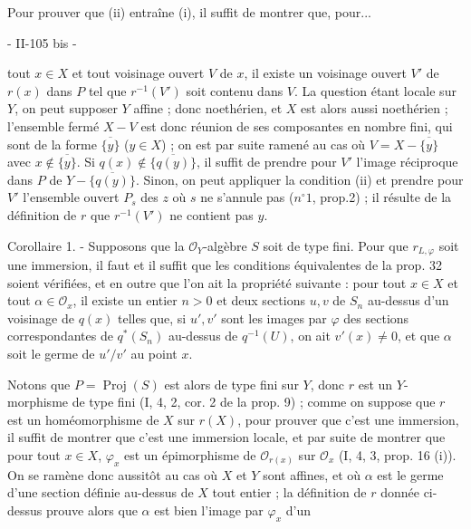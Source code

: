 Pour prouver que (ii) entraîne (i), il suffit de montrer que, pour...

\newpage


- II-105 bis -

tout $x \in X$ et tout voisinage ouvert $V$ de $x$, il existe un voisinage ouvert $V'$ de $r(x)$ dans $P$ tel que $r^{-1}(V')$ soit contenu dans $V$. La question étant locale sur $Y$, on peut supposer $Y$ affine ; donc noethérien, et $X$ est alors aussi noethérien ; l'ensemble fermé $X-V$ est donc réunion de ses composantes en nombre fini, qui sont de la forme $\overline{\{y\}}$ ($y \in X$) ; on est par suite ramené au cas où $V=X-\overline{\{y\}}$ avec $x \notin \overline{\{y\}}$. Si $q(x) \notin \overline{\{q(y)\}}$, il suffit de prendre pour $V'$ l'image réciproque dans $P$ de $Y-\overline{\{q(y)\}}$. Sinon, on peut appliquer la condition (ii) et prendre pour $V'$ l'ensemble ouvert $P_s$ des $z$ où $s$ ne s'annule pas ($n^{\circ}1$, prop.2) ; il résulte de la définition de $r$ que $r^{-1}(V')$ ne contient pas $y$.

Corollaire 1. - Supposons que la $\mathcal{O}_Y$-algèbre $S$ soit de type fini. Pour que $r_{L, \varphi}$ soit une immersion, il faut et il suffit que les conditions équivalentes de la prop. 32 soient vérifiées, et en outre que l'on ait la propriété suivante : pour tout $x \in X$ et tout $\alpha \in \mathcal{O}_x$, il existe un entier $n > 0$ et deux sections $u, v$ de $S_n$ au-dessus d'un voisinage de $q(x)$ telles que, si $u', v'$ sont les images par $\varphi$ des sections correspondantes de $q^*(S_n)$ au-dessus de $q^{-1}(U)$, on ait $v'(x) \neq 0$, et que $\alpha$ soit le germe de $u'/v'$ au point $x$.

Notons que $P = \operatorname{Proj}(S)$ est alors de type fini sur $Y$, donc $r$ est un $Y$-morphisme de type fini (I, 4, 2, cor. 2 de la prop. 9) ; comme on suppose que $r$ est un homéomorphisme de $X$ sur $r(X)$, pour prouver que c'est une immersion, il suffit de montrer que c'est une immersion locale, et par suite de montrer que pour tout $x \in X$, $\varphi_x$ est un épimorphisme de $\mathcal{O}_{r(x)}$ sur $\mathcal{O}_x$ (I, 4, 3, prop. 16 (i)). On se ramène donc aussitôt au cas où $X$ et $Y$ sont affines, et où $\alpha$ est le germe d'une section définie au-dessus de $X$ tout entier ; la définition de $r$ donnée ci-dessus prouve alors que $\alpha$ est bien l'image par $\varphi_x$ d'un

\newpage


